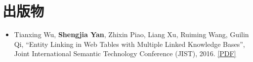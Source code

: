 \section{出版物}
\begin{itemize}
  \item Tianxing Wu, \textbf{Shengjia Yan}, Zhixin Piao, Liang Xu, Ruiming Wang, Guilin Qi, ``Entity Linking in Web Tables with Multiple Linked Knowledge Bases'', Joint International Semantic Technology Conference (JIST), 2016. \href{http://yanshengjia.com/file/jist2016.pdf}{[\underline{PDF}]}
\end{itemize}